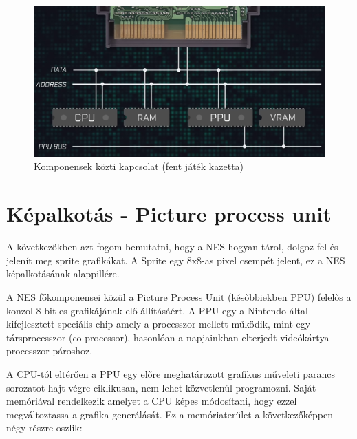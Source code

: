 	\begin{figure}[H]
		\centering
		\includegraphics[width=150mm, keepaspectratio]{figures/NES-databuses}
		\caption{Komponensek közti kapcsolat (fent játék kazetta) \cite{NES_hardware}}
		\label{fig:NES-Data-Buses}
	\end{figure}
	

\section{Képalkotás - Picture process unit}

A következőkben azt fogom bemutatni, hogy a NES hogyan tárol, dolgoz fel és jelenít meg sprite grafikákat. A Sprite egy 8x8-as pixel csempét jelent, ez a NES képalkotásának alappillére.

A NES főkomponensei közül a Picture Process Unit (későbbiekben PPU) felelős a konzol 8-bit-es grafikájának elő állításáért. A PPU egy a Nintendo által kifejlesztett speciális chip amely a processzor mellett működik, mint egy társprocesszor (co-processor), hasonlóan a napjainkban elterjedt videókártya-processzor pároshoz.

A CPU-tól eltérően a PPU egy előre meghatározott grafikus műveleti parancs sorozatot hajt végre ciklikusan, nem lehet közvetlenül programozni. Saját memóriával rendelkezik
amelyet a CPU képes módosítani, hogy ezzel megváltoztassa a grafika generálását. Ez a memóriaterület a következőképpen négy részre oszlik:

